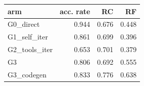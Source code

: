 \begin{tabular}{lrrr}
\toprule
arm & acc. rate & RC & RF \\
\midrule
G0\_direct & 0.944 & 0.676 & 0.448 \\
G1\_self\_iter & 0.861 & 0.699 & 0.396 \\
G2\_tools\_iter & 0.653 & 0.701 & 0.379 \\
G3 & 0.806 & 0.692 & 0.555 \\
G3\_codegen & 0.833 & 0.776 & 0.638 \\
\bottomrule
\end{tabular}
